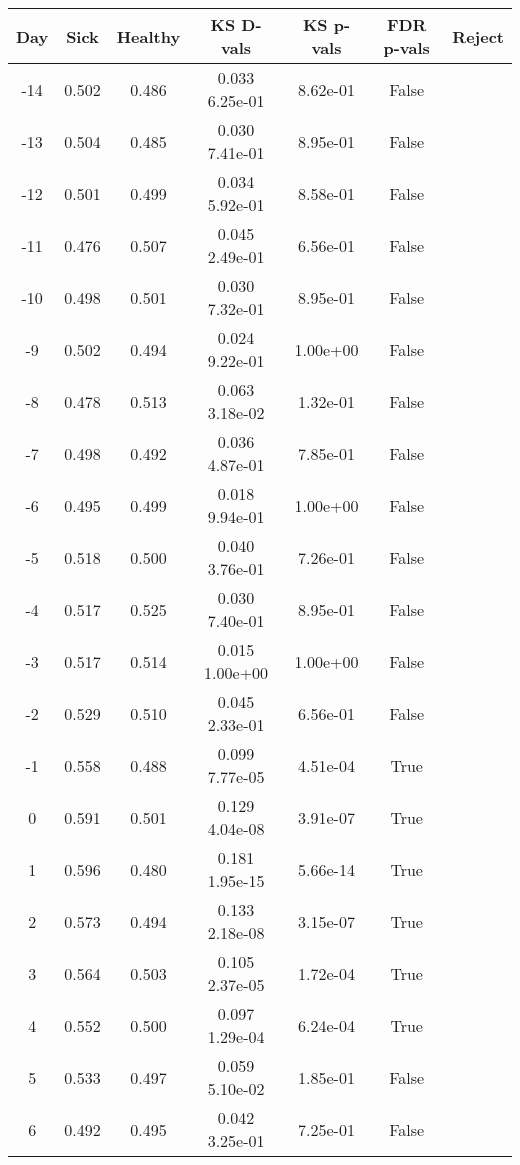 \begin{tabular}{c|c|c|c|c|c|c}
Day &  Sick & Healthy &  KS D-vals &  KS p-vals & FDR p-vals & Reject\\
\hline
-14 & 0.502 &   0.486 &   0.033   6.25e-01 &   8.62e-01 &  False\\
-13 & 0.504 &   0.485 &   0.030   7.41e-01 &   8.95e-01 &  False\\
-12 & 0.501 &   0.499 &   0.034   5.92e-01 &   8.58e-01 &  False\\
-11 & 0.476 &   0.507 &   0.045   2.49e-01 &   6.56e-01 &  False\\
-10 & 0.498 &   0.501 &   0.030   7.32e-01 &   8.95e-01 &  False\\
 -9 & 0.502 &   0.494 &   0.024   9.22e-01 &   1.00e+00 &  False\\
 -8 & 0.478 &   0.513 &   0.063   3.18e-02 &   1.32e-01 &  False\\
 -7 & 0.498 &   0.492 &   0.036   4.87e-01 &   7.85e-01 &  False\\
 -6 & 0.495 &   0.499 &   0.018   9.94e-01 &   1.00e+00 &  False\\
 -5 & 0.518 &   0.500 &   0.040   3.76e-01 &   7.26e-01 &  False\\
 -4 & 0.517 &   0.525 &   0.030   7.40e-01 &   8.95e-01 &  False\\
 -3 & 0.517 &   0.514 &   0.015   1.00e+00 &   1.00e+00 &  False\\
 -2 & 0.529 &   0.510 &   0.045   2.33e-01 &   6.56e-01 &  False\\
 -1 & 0.558 &   0.488 &   0.099   7.77e-05 &   4.51e-04 &   True\\
  0 & 0.591 &   0.501 &   0.129   4.04e-08 &   3.91e-07 &   True\\
  1 & 0.596 &   0.480 &   0.181   1.95e-15 &   5.66e-14 &   True\\
  2 & 0.573 &   0.494 &   0.133   2.18e-08 &   3.15e-07 &   True\\
  3 & 0.564 &   0.503 &   0.105   2.37e-05 &   1.72e-04 &   True\\
  4 & 0.552 &   0.500 &   0.097   1.29e-04 &   6.24e-04 &   True\\
  5 & 0.533 &   0.497 &   0.059   5.10e-02 &   1.85e-01 &  False\\
  6 & 0.492 &   0.495 &   0.042   3.25e-01 &   7.25e-01 &  False\\

\end{tabular}
